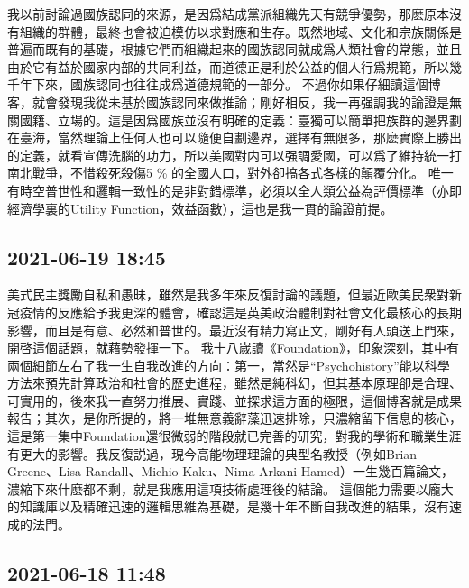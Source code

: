 \documentclass[twocolumn]{ctexart}
\begin{document}
我以前討論過國族認同的來源，是因爲結成黨派組織先天有競爭優勢，那麽原本沒有組織的群體，最終也會被迫模仿以求對應和生存。既然地域、文化和宗族關係是普遍而既有的基礎，根據它們而組織起來的國族認同就成爲人類社會的常態，並且由於它有益於國家内部的共同利益，而道德正是利於公益的個人行爲規範，所以幾千年下來，國族認同也往往成爲道德規範的一部分。
不過你如果仔細讀這個博客，就會發現我從未基於國族認同來做推論；剛好相反，我一再强調我的論證是無關國籍、立場的。這是因爲國族並沒有明確的定義：臺獨可以簡單把族群的邊界劃在臺海，當然理論上任何人也可以隨便自劃邊界，選擇有無限多，那麽實際上勝出的定義，就看宣傳洗腦的功力，所以美國對内可以强調愛國，可以爲了維持統一打南北戰爭，不惜殺死殺傷5 \% 的全國人口，對外卻搞各式各樣的顛覆分化。
唯一有時空普世性和邏輯一致性的是非對錯標準，必須以全人類公益為評價標準（亦即經濟學裏的Utility Function，效益函數），這也是我一貫的論證前提。
\subsection*{2021-06-19 18:45}

美式民主獎勵自私和愚昧，雖然是我多年來反復討論的議題，但最近歐美民衆對新冠疫情的反應給予我更深的體會，確認這是英美政治體制對社會文化最核心的長期影響，而且是有意、必然和普世的。最近沒有精力寫正文，剛好有人頭送上門來，開啓這個話題，就藉勢發揮一下。
我十八嵗讀《Foundation》，印象深刻，其中有兩個細節左右了我一生自我改進的方向：第一，當然是“Psychohistory”能以科學方法來預先計算政治和社會的歷史進程，雖然是純科幻，但其基本原理卻是合理、可實用的，後來我一直努力推展、實踐、並探求這方面的極限，這個博客就是成果報告；其次，是你所提的，將一堆無意義辭藻迅速排除，只濃縮留下信息的核心，這是第一集中Foundation還很微弱的階段就已完善的研究，對我的學術和職業生涯有更大的影響。我反復説過，現今高能物理理論的典型名教授（例如Brian Greene、Lisa Randall、Michio Kaku、Nima Arkani-Hamed）一生幾百篇論文，濃縮下來什麽都不剩，就是我應用這項技術處理後的結論。
這個能力需要以龐大的知識庫以及精確迅速的邏輯思維為基礎，是幾十年不斷自我改進的結果，沒有速成的法門。
\subsection*{2021-06-18 11:48}
\end{document}
